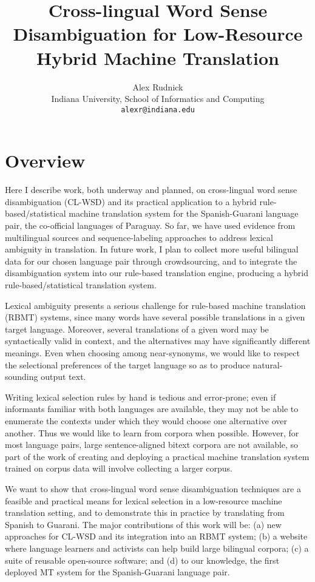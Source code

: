 \documentclass{article}
\title{Cross-lingual Word Sense Disambiguation for Low-Resource Hybrid Machine
Translation}
\author{Alex Rudnick \\
	    Indiana University, School of Informatics and Computing \\
	    {\tt alexr@indiana.edu}}
\date{}
\begin{document}
\maketitle

\section{Overview}
Here I describe work, both underway and planned, on cross-lingual word sense
disambiguation (CL-WSD) and its practical application to a hybrid
rule-based/statistical machine translation system for the Spanish-Guarani
language pair, the co-official languages of Paraguay. So far, we have used
evidence from multilingual sources and sequence-labeling approaches to address
lexical ambiguity in translation. In future work, I plan to collect more useful
bilingual data for our chosen language pair through crowdsourcing, and to
integrate the disambiguation system into our rule-based translation engine,
producing a hybrid rule-based/statistical translation system.

Lexical ambiguity presents a serious challenge for rule-based machine
translation (RBMT) systems, since many words have several possible translations
in a given target language. Moreover, several translations of a given word may
be syntactically valid in context, and the alternatives may have significantly
different meanings. Even when choosing among near-synonyms, we would like to
respect the selectional preferences of the target language so as to produce
natural-sounding output text.

Writing lexical selection rules by hand is tedious and error-prone; even if
informants familiar with both languages are available, they may not be able to
enumerate the contexts under which they would choose one alternative over
another. Thus we would like to learn from corpora when possible. However, for
most language pairs, large sentence-aligned bitext corpora are not available,
so part of the work of creating and deploying a practical machine translation
system trained on corpus data will involve collecting a larger corpus.

We want to show that cross-lingual word sense disambiguation techniques are a
feasible and practical means for lexical selection in a low-resource machine
translation setting, and to demonstrate this in practice by translating from
Spanish to Guarani. The major contributions of this work will be: (a) new
approaches for CL-WSD and its integration into an RBMT system; (b) a website
where language learners and activists can help build large bilingual corpora;
(c) a suite of reusable open-source software; and (d) to our knowledge, the
first deployed MT system for the Spanish-Guarani language pair.
\end{document}
